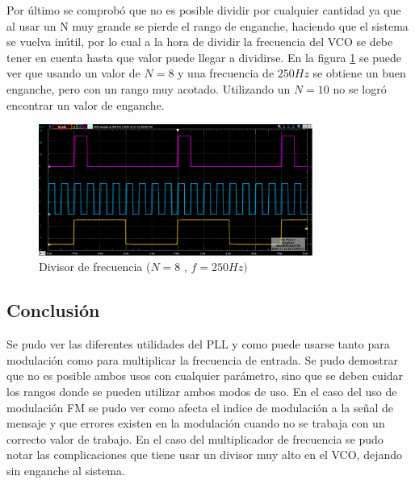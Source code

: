 \documentclass[10pt,a4paper]{article}
\begin{document}
Por último se comprobó que no es posible dividir por cualquier cantidad ya que al usar un N muy grande se pierde el rango de enganche, haciendo que el sistema se vuelva inútil, por lo cual a la hora de dividir la frecuencia del VCO se debe tener en cuenta hasta que valor puede llegar a dividirse. En la figura \ref{fig:Div8Frec250} se puede ver que usando un valor de $N=8$ y una frecuencia de $250Hz$ se obtiene un buen enganche, pero con un rango muy acotado. Utilizando un $N=10$ no se logró encontrar un valor de enganche.

\begin{figure}[H]
	\includegraphics[width= 0.8\textwidth]{../1. PLL/Imagenes/DIV8f250.png}
	\centering
	\caption{Divisor de frecuencia ($N=8$ , $f=250Hz)$}
	\label{fig:Div8Frec250}
\end{figure}

\subsection{Conclusión}
Se pudo ver las diferentes utilidades del PLL y como puede usarse tanto para modulación como para multiplicar la frecuencia de entrada. Se pudo demostrar que no es posible ambos usos con cualquier parámetro, sino que se deben cuidar los rangos donde se pueden utilizar ambos modos de uso. 
\newline
En el caso del uso de modulación FM se pudo ver como afecta el indice de modulación a la señal de mensaje y que errores existen en la modulación cuando no se trabaja con un correcto valor de trabajo.
\newline
En el caso del multiplicador de frecuencia se pudo notar las complicaciones que tiene usar un divisor muy alto en el VCO, dejando sin enganche al sistema. 
\end{document}

